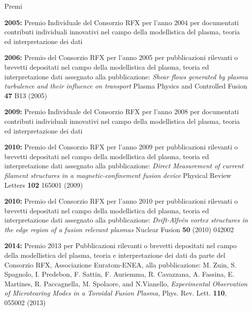 \begin{statementblock}{Premi}
\end{statementblock}
\begin{enumerate}[label={[M\arabic*]}]
\item \textbf{2005:} Premio Individuale del Consorzio RFX per l'anno 2004 per
  documentati contributi individuali innovativi nel campo della
  modellistica del plasma, teoria ed interpretazione dei dati
  
\item \textbf{2006:} Premio del Consorzio RFX per l'anno 2005 per
  pubblicazioni rilevanti o brevetti depositati nel campo della
  modellistica del plasma, teoria ed interpretazione dati assegnato
  alla pubblicazione: \emph{Shear flows generated by plasma turbulence
    and their influence on transport} Plasma Physics and Controlled
  Fusion \textbf{47} B13 (2005)
  
\item \textbf{2009:} Premio Individuale del Consorzio RFX per l'anno 2008 per
  documentati contributi individuali innovativi nel campo della
  modellistica del plasma, teoria ed interpretazione dei dati

\item \textbf{2010:} Premio del Consorzio RFX per l'anno 2009 per
  pubblicazioni rilevanti o brevetti depositati nel campo della
  modellistica del plasma, teoria ed interpretazione dati assegnato
  alla pubblicazione: \emph{Direct Measurement of current filament
    structures in a magnetic-confinement fusion device} Physical
  Review Letters \textbf{102} 165001 (2009)
  
\item \textbf{2010:} Premio del Consorzio RFX per l'anno 2010 per
  pubblicazioni rilevanti o brevetti depositati nel campo della
  modellistica del plasma, teoria ed interpretazione dati assegnato
  alla pubblicazione: \emph{Drift-Alfv{\'e}n vortex structures in the
    edge region of a fusion relevant plasmas} Nuclear Fusion
  \textbf{50} (2010) 042002

\item \textbf{2014:} Premio 2013 per Pubblicazioni rilevanti o brevetti
  depositati nel campo della modellistica del plasma, teoria e
  interpretazione dei dati da parte del Consorzio RFX, Associazione
  Euratom-ENEA, alla pubblicazione: M. Zuin, S. Spagnolo, I. Predebon,
  F. Sattin, F. Auriemma, R. Cavazzana, A. Fassina, E. Martines,
  R. Paccagnella, M. Spolaore, and N.Vianello,
  \emph{Experimental Observation of Microtearing Modes in a Toroidal
    Fusion Plasma}, Phys. Rev. Lett. \textbf{110}, 055002 (2013)


\end{enumerate}
